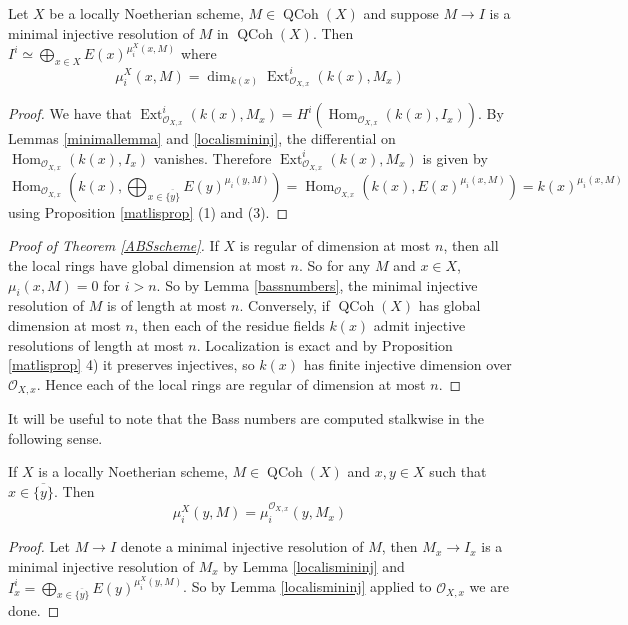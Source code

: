 \documentclass[12pt,oneside]{amsart}
\DeclareMathOperator{\Hom}{Hom}
\DeclareMathOperator{\QCoh}{QCoh}
\DeclareMathOperator{\Ext}{Ext}
\begin{document}
\begin{lemma} \label{bassnumbers} Let $X$ be a locally Noetherian scheme, $M \in \QCoh(X)$ and suppose $M \to I$ is a minimal injective resolution of $M$ in $\QCoh(X)$. Then $I^i \simeq \bigoplus_{x \in X} E(x)^{\mu_i^X(x,M)}$ where 
\[
\mu_i^X(x,M) = \dim_{k(x)} \Ext^i_{\mathcal{O}_{X,x}}(k(x),M_x)
\]
\end{lemma}




\begin{proof} 
We have that $\Ext^i_{\mathcal{O}_{X,x}}(k(x),M_x) = H^i(\Hom_{\mathcal{O}_{X,x}}(k(x),I_x))$. By Lemmas \ref{minimallemma} and \ref{localismininj}, the differential on $\Hom_{\mathcal{O}_{X,x}}(k(x),I_x)$ vanishes. Therefore $\Ext^i_{\mathcal{O}_{X,x}}(k(x),M_x)$ is given by
\[
 \Hom_{\mathcal{O}_{X,x}}(k(x),\bigoplus_{x \in \overline{\{y\}}} E(y)^{\mu_i(y,M)}) = \Hom_{\mathcal{O}_{X,x}}(k(x),E(x)^{\mu_i(x,M)}) = k(x)^{\mu_i(x,M)}
\]
using Proposition \ref{matlisprop} (1) and (3).
\end{proof}


\begin{proof}[Proof of Theorem \ref{ABSscheme}]
If $X$ is regular of dimension at most $n$, then all the local rings have global dimension at most $n$. So for any $M$ and $x \in X$, $\mu_i(x,M) = 0$ for $i > n$. So by Lemma \ref{bassnumbers}, the minimal injective resolution of $M$ is of length at most $n$.  Conversely, if $\QCoh(X)$ has global dimension at most $n$, then each of the residue fields $k(x)$ admit injective resolutions of length at most $n$. Localization is exact and by Proposition \ref{matlisprop} 4) it preserves injectives, so $k(x)$ has finite injective dimension over $\mathcal{O}_{X,x}$. Hence each of the local rings are regular of dimension at most $n$. 
\end{proof}

It will be useful to note that the Bass numbers are computed stalkwise in the following sense. 


\begin{prop} \label{stalkwise}
If $X$ is a locally Noetherian scheme, $M \in \QCoh(X)$ and $x,y \in X$ such that $x \in \overline{\{y\}}$. Then
\[
\mu_i^X(y,M) = \mu_i^{\mathcal{O}_{X,x}}(y,M_x)
\]
\end{prop}

\begin{proof}
Let $M \to I$ denote a minimal injective resolution of $M$, then $M_x \to I_x$ is a minimal injective resolution of $M_x$ by Lemma \ref{localismininj} and $I_x^i = \bigoplus_{x \in \overline{\{y\}}} E(y)^{\mu_i^X(y,M)}$. So by Lemma \ref{localismininj} applied to $\mathcal{O}_{X,x}$ we are done. 
\end{proof}
\end{document}
